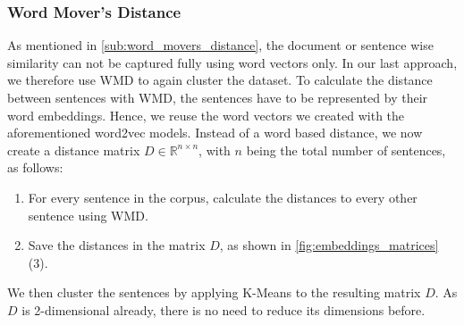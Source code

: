 \subsubsection{Word Mover's Distance} %
\label{sub:own_wmd}
As mentioned in \autoref{sub:word_movers_distance}, the document or sentence wise similarity can not be captured fully using word vectors only. In our last approach, we therefore use WMD to again cluster the dataset. To calculate the distance between sentences with WMD, the sentences have to be represented by their word embeddings. Hence, we reuse the word vectors we created with the aforementioned word2vec models. Instead of a word based distance, we now create a distance matrix $D\in\mathbb{R}^{n\times n}$, with $n$ being the total number of sentences, as follows:
\begin{enumerate}
	\item For every sentence in the \crowdre{} corpus, calculate the distances to every other sentence using WMD.
	\item Save the distances in the matrix $D$, as shown in \autoref{fig:embeddings_matrices} (3).
\end{enumerate}
We then cluster the sentences by applying K-Means to the resulting matrix $D$. 
As $D$ is 2-dimensional already, there is no need to reduce its dimensions before.